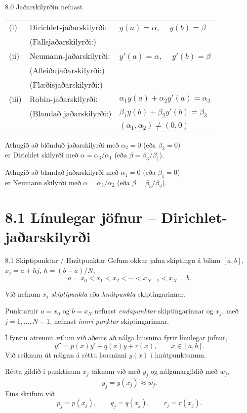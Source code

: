 \begin{frame}{8.0 Jaðarskilyrðin nefnast}
\begin{tabular}{lll}
(i)  &Dirichlet-jaðarskilyrði: &  $y(a)=\alpha$, \ \  $y(b)=\beta$\\
&(Fallsjaðarskilyrði:) \\ \pause
(ii)&Neumann-jaðarskilyrði: 
& $y'(a)=\alpha$, \ \  $y'(b)=\beta$\\
&(Afleiðujaðarskilyrði:)\\
&(Flæðisjaðarskilyrði:)\\\pause
(iii)&Robin-jaðarskilyrði: 
&$\alpha_1y(a)+\alpha_2 y'(a)=\alpha_3$ \\ 
&(Blandað jaðarskilyrði:)&$\beta_1 y(b)+\beta_2y'(b)=\beta_3$\\
&&$(\alpha_1,\alpha_2)\neq (0,0)$
\end{tabular}
\pause

\bigskip
Athugið að blönduð jaðarskilyrði með $\alpha_2=0$ (eða $\beta_2=0$)\\
er Dirichlet skilyrði með 
$\alpha=\alpha_3/\alpha_1$ (eða $\beta=\beta_3/\beta_1$).
\pause

\smallskip
Athugið að blandað jaðarskilyrði með $\alpha_1=0$ (eða $\beta_1=0$)\\
er  Neumann skilyrði með 
$\alpha=\alpha_3/\alpha_2$ (eða $\beta=\beta_3/\beta_2$).
\end{frame}


\section*{8.1 Línulegar jöfnur -- Dirichlet-jaðarskilyrði}
\begin{frame}{8.1 Skiptipunktar / Hnútpunktar} 
Gefum okkur jafna skiptingu á bilinu $[a,b]$, $x_j=a+hj$, 
$h=(b-a)/N$,
$$
a=x_0<x_1<x_2<\cdots<x_{N-1}<x_N=b.
$$

\pause
Við nefnum $x_j$  {\it skiptipunkta} eða {\it hnútpunkta} skiptingarinnar.  

\pause
\smallskip
Punktarnir $a=x_0$ og $b=x_N$ nefnast {\it endapunktar}
skiptingarinnar og $x_j$, með $j=1,\dots,N-1$, 
nefnast {\it innri punktar} skiptingarinnar.

\pause
\smallskip
Í fyrstu atrennu ætlum við aðeins að nálga lausnina fyrir
línulegar jöfnur,
$$
y''=p(x)y'+q(x)y+r(x), \qquad x\in [a,b].
$$
Við reiknum út nálgun á réttu lausninni $y(x)$ í
hnútpunktunum. 

\pause
\smallskip
Rétta gildið í punktinum $x_j$ táknum við með $y_j$ og nálgunargildið
með $w_j$, 
$$
y_j=y(x_j)\approx w_j.
$$\pause 
Eins skrifum við 
$$
p_j=p(x_j), \qquad q_j=q(x_j), \qquad  r_j=r(x_j).
$$
\end{frame}

